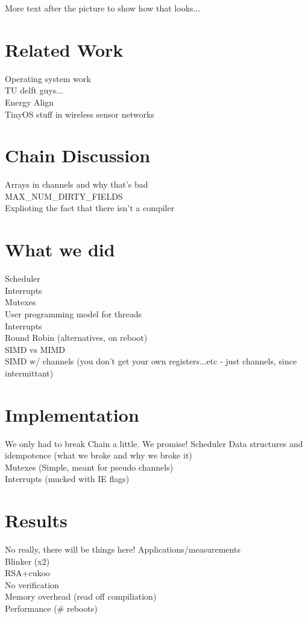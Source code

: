 \documentclass[11pt]{sensys-proc}
\newcommand{\chain}{Chain\xspace}
\begin{document}
More text after the picture to show how that looks...


\section{Related Work}
Operating system work\\
TU delft guys...\\
Energy Align\\
TinyOS stuff in wireless sensor networks\\

\section{Chain Discussion}
Arrays in channels and why that's bad\\
MAX\_NUM\_DIRTY\_FIELDS\\
Explioting the fact that there isn't a compiler\\


\section{What we did} %
Scheduler\\
Interrupts\\
Mutexes\\
User programming model for threads\\
Interrupts\\
Round Robin (alternatives, on reboot)\\
SIMD vs MIMD\\
SIMD w/ channels (you don't get your own registers...etc -
    just channels, since intermittant)\\


\section{Implementation}
We only had to break \chain a little. We promise!
Scheduler Data structures and idempotence (what we broke and why we broke it)\\
Mutexes (Simple, meant for pseudo channels)\\
Interrupts (mucked with IE flags)\\


\section{Results}
No really, there will be things here!
Applications/measurements\\
Blinker (x2)\\
RSA+cukoo\\
No verification\\
Memory overhead (read off compiliation)\\
Performance (\# reboots)\\
\end{document}
